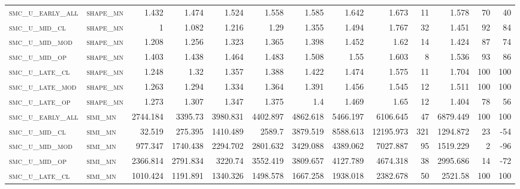 \begin{landscape}
\begin{center}
\begin{footnotesize}
\begin{longtable}{llrrrrrrrr|rrr}
\textsc{smc\_u\_early\_all} & \textsc{shape\_mn }   & 1.432    & 1.474    & 1.524    & 1.558    & 1.585    & 1.642    & 1.673     & 11     & 1.578         & 70            & 40              \\
\textsc{smc\_u\_mid\_cl   } & \textsc{shape\_mn }   & 1        & 1.082    & 1.216    & 1.29     & 1.355    & 1.494    & 1.767     & 32     & 1.451         & 92            & 84              \\
\textsc{smc\_u\_mid\_mod  } & \textsc{shape\_mn }   & 1.208    & 1.256    & 1.323    & 1.365    & 1.398    & 1.452    & 1.62      & 14     & 1.424         & 87            & 74              \\
\textsc{smc\_u\_mid\_op   } & \textsc{shape\_mn }   & 1.403    & 1.438    & 1.464    & 1.483    & 1.508    & 1.55     & 1.603     & 8      & 1.536         & 93            & 86              \\
\textsc{smc\_u\_late\_cl  } & \textsc{shape\_mn }   & 1.248    & 1.32     & 1.357    & 1.388    & 1.422    & 1.474    & 1.575     & 11     & 1.704         & 100           & 100             \\
\textsc{smc\_u\_late\_mod } & \textsc{shape\_mn }   & 1.263    & 1.294    & 1.334    & 1.364    & 1.391    & 1.456    & 1.545     & 12     & 1.511         & 100           & 100             \\
\textsc{smc\_u\_late\_op  } & \textsc{shape\_mn }   & 1.273    & 1.307    & 1.347    & 1.375    & 1.4      & 1.469    & 1.65      & 12     & 1.404         & 78            & 56              \\
\textsc{smc\_u\_early\_all} & \textsc{simi\_mn  }   & 2744.184 & 3395.73  & 3980.831 & 4402.897 & 4862.618 & 5466.197 & 6106.645  & 47     & 6879.449      & 100           & 100             \\
\textsc{smc\_u\_mid\_cl   } & \textsc{simi\_mn  }   & 32.519   & 275.395  & 1410.489 & 2589.7   & 3879.519 & 8588.613 & 12195.973 & 321    & 1294.872      & 23            & -54             \\
\textsc{smc\_u\_mid\_mod  } & \textsc{simi\_mn  }   & 977.347  & 1740.438 & 2294.702 & 2801.632 & 3429.088 & 4389.062 & 7027.887  & 95     & 1519.229      & 2             & -96             \\
\textsc{smc\_u\_mid\_op   } & \textsc{simi\_mn  }   & 2366.814 & 2791.834 & 3220.74  & 3552.419 & 3809.657 & 4127.789 & 4674.318  & 38     & 2995.686      & 14            & -72             \\
\textsc{smc\_u\_late\_cl  } & \textsc{simi\_mn  }   & 1010.424 & 1191.891 & 1340.326 & 1498.578 & 1667.258 & 1938.018 & 2382.678  & 50     & 2521.58       & 100           & 100             \\

\end{longtable}
\end{footnotesize}
\end{center}
\end{landscape}
